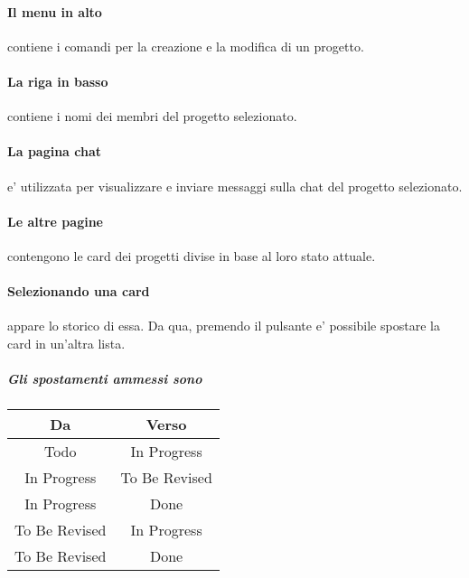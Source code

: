 \paragraph*{Il menu in alto}  contiene i comandi per la creazione e la modifica di un progetto.
\paragraph*{La riga in basso} contiene i nomi dei membri del progetto selezionato.
\paragraph*{La pagina chat} e' utilizzata per visualizzare e inviare messaggi sulla chat del progetto selezionato.
\paragraph*{Le altre pagine} contengono le card dei progetti divise in base al loro stato attuale.
\paragraph*{Selezionando una card} appare lo storico di essa. Da qua, premendo il pulsante  e' possibile spostare la card in un'altra lista.
\subparagraph*{Gli spostamenti ammessi sono}
\begin{center}
    \begin{tabular}{||c|c||}
        \hline
        \textbf{Da} & \textbf{Verso}\\
        \hline\hline
        Todo & In Progress\\
        \hline
        In Progress & To Be Revised\\
        \hline
        In Progress & Done\\
        \hline
        To Be Revised & In Progress\\
        \hline
        To Be Revised & Done\\
        \hline
    \end{tabular}
\end{center}